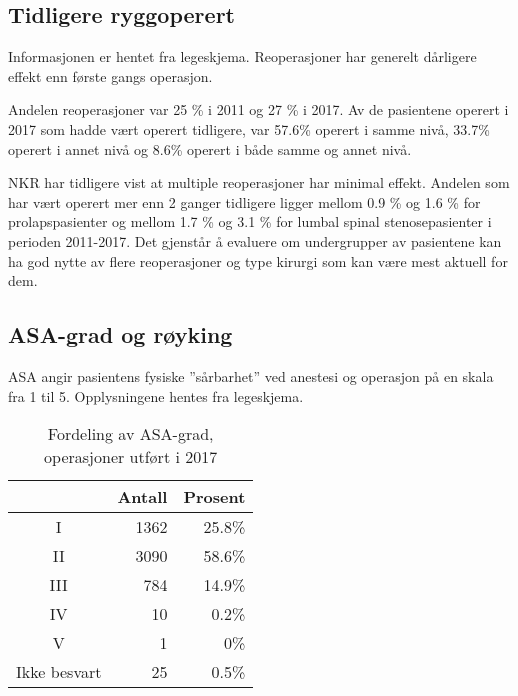 \clearpage

\subsection{Tidligere ryggoperert}
Informasjonen er hentet fra legeskjema.
Reoperasjoner har generelt dårligere effekt enn første gangs operasjon.





Andelen reoperasjoner var 25 \% i 2011 og 27 \% i 2017.
Av de pasientene operert i 2017 som hadde vært operert tidligere, var 57.6\% 
operert i samme nivå, 33.7\% 
operert i annet nivå og 8.6\% 
operert i både samme og annet nivå.




NKR har tidligere vist at multiple reoperasjoner har minimal effekt. Andelen som har vært operert 
mer enn 2 ganger tidligere ligger mellom 0.9 \%
og 1.6 \% for prolapspasienter og mellom 1.7 \%
og 3.1 \% for lumbal spinal stenosepasienter i perioden 2011-2017. 
Det gjenstår å evaluere om undergrupper av pasientene kan ha god nytte av flere reoperasjoner og type kirurgi som kan være mest aktuell for dem.


\subsection{ASA-grad og røyking}
ASA angir pasientens fysiske ”sårbarhet” ved anestesi og operasjon på en skala fra 1 til 5. 
Opplysningene hentes fra legeskjema.
\begin{table}[ht]
\centering
\begin{tabular}{crr}
  \hline
 & Antall & Prosent \\ 
  \hline
I & 1362 & 25.8\% \\ 
  II & 3090 & 58.6\% \\ 
  III & 784 & 14.9\% \\ 
  IV & 10 & 0.2\% \\ 
  V & 1 & 0\% \\ 
  Ikke besvart & 25 & 0.5\% \\ 
   \hline
\end{tabular}
\caption{Fordeling av ASA-grad, operasjoner utført i 2017} 
\label{tab:ASA}
\end{table}


